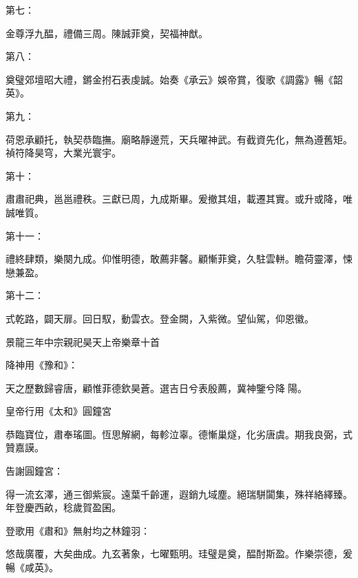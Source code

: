 \begin{pinyinscope}
 第七：



 金尊浮九醖，禮備三周。陳誠菲奠，契福神猷。



 第八：



 奠璧郊壇昭大禮，鏘金拊石表虔誠。始奏《承云》娛帝賞，復歌《調露》暢《韶英》。



 第九：



 荷恩承顧托，執契恭臨撫。廟略靜邊荒，天兵曜神武。有截資先化，無為遵舊矩。禎符降昊穹，大業光寰宇。



 第十：



 肅肅祀典，邕邕禮秩。三獻已周，九成斯畢。爰撤其俎，載遷其實。或升或降，唯誠唯質。



 第十一：



 禮終肆類，樂闋九成。仰惟明德，敢薦非馨。顧慚菲奠，久駐雲軿。瞻荷靈澤，悚戀兼盈。



 第十二：



 式乾路，闢天扉。回日馭，動雲衣。登金闕，入紫微。望仙駕，仰恩徽。



 景龍三年中宗親祀昊天上帝樂章十首



 降神用《豫和》：



 天之歷數歸睿唐，顧惟菲德欽昊蒼。選吉日兮表殷薦，冀神鑒兮降陽。



 皇帝行用《太和》圓鐘宮



 恭臨寶位，肅奉瑤圖。恆思解網，每軫泣辜。德慚巢燧，化劣唐虞。期我良弼，式贊嘉謨。



 告謝圓鐘宮：



 得一流玄澤，通三御紫宸。遠葉千齡運，遐銷九域塵。絕瑞駢闐集，殊祥絡繹臻。年登慶西畝，稔歲賀盈囷。



 登歌用《肅和》無射均之林鐘羽：



 悠哉廣覆，大矣曲成。九玄著象，七曜甄明。珪璧是奠，醖酎斯盈。作樂崇德，爰暢《咸英》。




\end{pinyinscope}
